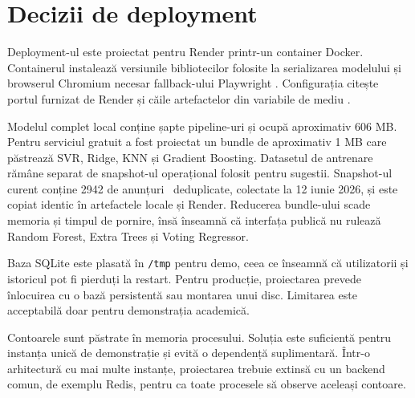 \section{Decizii de deployment}
\label{sec:app-deployment-design}

Deployment-ul este proiectat pentru Render printr-un container Docker. Containerul instalează versiunile bibliotecilor folosite la serializarea modelului și browserul Chromium necesar fallback-ului Playwright \cite{playwright_docs}. Configurația citește portul furnizat de Render și căile artefactelor din variabile de mediu \cite{render_docs}.

Modelul complet local conține șapte pipeline-uri și ocupă aproximativ 606 MB. Pentru serviciul gratuit a fost proiectat un bundle de aproximativ 1 MB care păstrează SVR, Ridge, KNN și Gradient Boosting. Datasetul de antrenare rămâne separat de snapshot-ul operațional folosit pentru sugestii. Snapshot-ul curent conține 2942 de anunțuri \autovit\ deduplicate, colectate la 12 iunie 2026, și este copiat identic în artefactele locale și Render. Reducerea bundle-ului scade memoria și timpul de pornire, însă înseamnă că interfața publică nu rulează Random Forest, Extra Trees și Voting Regressor.

Baza SQLite este plasată în \texttt{/tmp} pentru demo, ceea ce înseamnă că utilizatorii și istoricul pot fi pierduți la restart. Pentru producție, proiectarea prevede înlocuirea cu o bază persistentă sau montarea unui disc. Limitarea este acceptabilă doar pentru demonstrația academică.

Contoarele sunt păstrate în memoria procesului. Soluția este suficientă pentru instanța unică de demonstrație și evită o dependență suplimentară. Într-o arhitectură cu mai multe instanțe, proiectarea trebuie extinsă cu un backend comun, de exemplu Redis, pentru ca toate procesele să observe aceleași contoare.
